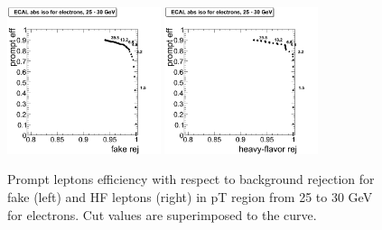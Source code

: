\begin{figure}[htbp]
\begin{center}
 \includegraphics[width = 0.4\textwidth]{pictures/trackCut/bkgdRej_sigEff/elec_fake_ptCut4_ptCut5.png}
\includegraphics[width = 0.4\textwidth]{pictures/trackCut/bkgdRej_sigEff/elec_nonPrompt_ptCut4_ptCut5.png}
\caption{\small{Prompt leptons efficiency with respect to background 
rejection for fake (left) and HF leptons (right) in pT region
from 25 to 30 GeV for electrons. 
Cut values are superimposed to the curve.}\label{fig:ecalrej_el5}}
\end{center}
\end{figure}


